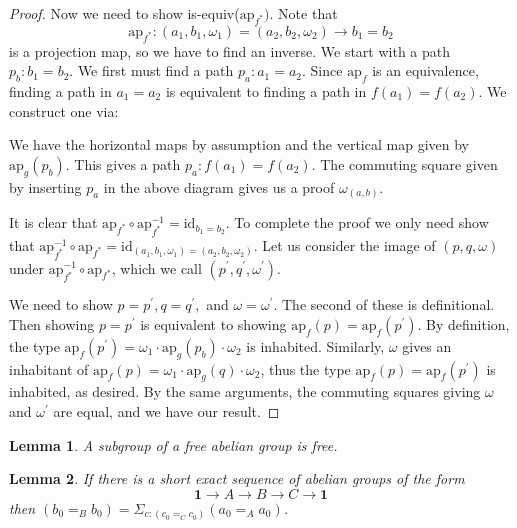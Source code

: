 \documentclass{article}
\newcommand{\0}{\mathbf{0}}
\newcommand{\1}{\mathbf{1}}
\newcommand{\inv}{^{-1}}
\newcommand{\pr}{^\prime}
\newcommand{\ap}[1]{\textrm{ap}_{#1}}
\newcommand{\id}{\textrm{id}}
\newcommand{\TODO}[1]{\marginpar{\textcolor{blue}{#1}}}
\newtheorem{lemma}{Lemma}
\begin{document}
\begin{proof}
Now we need to show is-equiv($\ap{f^*})$. Note that $$\ap{f^*} : (a_1,b_1,\omega_1) = (a_2,b_2,\omega_2) \to b_1 = b_2 $$ is a projection map, so we have to find an inverse. We start with a path $p_b : b_1 = b_2$. We first must find a path $p_a: a_1 = a_2$. Since $\ap{f}$ is an equivalence, finding a path in $a_1 = a_2$ is equivalent to finding a path in $f(a_1) = f(a_2)$. We construct one via:
\begin{center}
\end{center}
We have the horizontal maps by assumption and the vertical map given by $\ap{g}(p_b)$. This gives a path $p_a : f(a_1) = f(a_2)$. The commuting square given by inserting $p_a$ in the above diagram gives us a proof $\omega_{(a,b)}$.

It is clear that $\ap{f^*} \circ \ap{f^*}\inv = \id_{b_1 = b_2}$. To complete the proof we only need show that $\ap{f^*}\inv \circ \ap{f^*} = \id_{(a_1,b_1,\omega_1) = (a_2,b_2,\omega_2)}$. Let us consider the image of $(p,q,\omega)$ under $\ap{f^*}\inv \circ \ap{f^*}$, which we call $(p\pr,q\pr,\omega\pr)$.

We need to show $p = p\pr, q = q\pr,$ and $\omega = \omega\pr.$ The second of these is definitional. Then showing $p = p\pr$ is equivalent to showing $\ap{f}(p) = \ap{f}(p\pr)$. By definition, the type $\ap{f}(p\pr) = \omega_1 \cdot \ap{g}(p_b) \cdot \omega_2$ is inhabited. Similarly, $\omega$ gives an inhabitant of $\ap{f}(p) = \omega_1 \cdot \ap{g}(q) \cdot \omega_2$, thus the type $\ap{f}(p) = \ap{f}(p\pr)$ is inhabited, as desired. By the same arguments, the commuting squares giving $\omega$ and $\omega\pr$ are equal, and we have our result.
\end{proof}

\begin{lemma}\label{lemma: subgroup of free abelian}
A subgroup of a free abelian group is free.
\end{lemma}

\begin{lemma}\label{lemma: group extension}
If there is a short exact sequence of abelian groups \TODO{Abelian might be necessary for the SESs.} of the form $$ \1 \to A \to B \to C \to \1$$then $(b_0 =_B b_0) = \Sigma_{c : (c_0 =_C c_0)} (a_0 =_A a_0)$.
\end{lemma}
\end{document}
